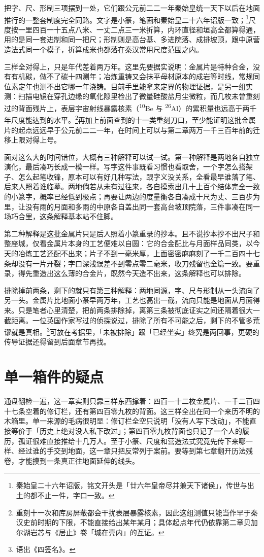 把字、尺、形制三项摆到一处，它们跟公元前二二一年秦始皇统一天下以后在地面推行的一整套制度完全同路。文字是小篆，笔画和秦始皇二十六年诏版一致；\footnote{秦始皇二十六年诏版，铭文开头是「廿六年皇帝尽并兼天下诸侯」，传世与出土的都不止一件，字口一致。}尺度按一里四百一十五点八米、一丈二点三一米折算，内环直径和垣高全都算得通，用的是同一套进制和同一把尺；形制则是高台基、多进院落、成排坡顶，跟中原营造法式同一个模子，折算成米也都落在秦汉常用尺度范围之内。

三样全对得上，只是年代差着两万年。这里先要据实说明：金属片是特种合金，没有有机碳，做不了碳十四测年；冶炼重铸又会抹平母材原本的成岩等时线，常规同位素定年也测不出它哪一年浇铸。目前手里能拿来定界的物理证据，是另一组实测：扫描电镜在穿孔边缘的氧化隙里检出了微量硅酸盐月尘微粒，而几枚未曾重刻过的背面残片上，表层宇宙射线暴露核素（\textsuperscript{10}Be 与 \textsuperscript{26}Al）的累积量也远高于两千年尺度能达到的水平。\footnote{重刻十一次和库房屏蔽都会干扰表层暴露核素，因此这组测值只能当作早于秦汉史前时期的下限，不能直接给出某年某月；具体起点年代仍依靠第二章贝加尔湖岩芯与《居止》卷「城在壳内」的互证。}再加上前面查到的十一类重刻刀口，至少能证明这批金属片的起点远远早于公元前二二一年，在时间上可以与第二章两万一千三百年前的迁移上限对得上号。

面对这么大的时间错位，大概有三种解释可以试一试。第一种解释是两地各自独立演化，最后凑巧长成一模一样。写字这件事既看习惯也看取舍，一个字怎么搭架子、怎么起笔收锋，原本可以有好几种写法，跟字义没关系，全看最早谁落了笔、后来人照着谁临摹。两地倘若从未有过往来，各自摸索出几十上百个结体完全一致的小篆字，概率已经低到极点；再要让两边的度量衡各自凑成十尺为丈、三百步为里，让没有雨的月面和多雨的中原各自盖出同一套高台坡顶院落，三件事凑在同一场巧合里，这条解释基本站不住脚。

第二种解释是这批金属片只是后人照着小篆重录的抄本。且不说抄本抄不出尺子和整座城，仅看金属片本身的工艺便难以自圆：它的合金配比与月面样品同类，以今天的冶炼工艺还配不出来；片子不到一毫米厚，上面密密麻麻刻了一千二百四十七条却没有一片开裂；字口深浅误差不到零点零二毫米，收刀残留也全篇一致。要重录，得先重造出这么薄的合金片，既然今天造不出来，这条解释也可以排除。

排除掉前两条，剩下的就只有第三种解释：两地同源，字、尺与形制从一头流向了另一头。金属片比地面小篆早两万年，工艺也高出一截，流向只能是地面从月面得来。只是笔者心里清楚，把前两条排除掉，离第三条被彻底证实之间还隔着很大一截距离。一位英国作家写过的侦探说过，排除了所有不可能之后，剩下的不管多荒谬就是真相。\footnote{语出《四签名》。}可放在考据里，「未被排除」跟「已经坐实」终究是两回事，更硬的传导证据还得留到后面章节再找。

\section{单一箱件的疑点}

通盘翻检一遍，这一章实则只靠三样东西撑着：四百一十二枚金属片、一千二百四十七条空着的修订栏，还有第四百零九枚的背面。这三样全出在同一个来历不明的木箱里。单一来源的毛病很明显：修订栏全空只说明「没有人写下改动」，不能直接等价于「历史上绝对没人私下改过」；第四百零九枚背面也只记了一个人的履历，孤证很难直接推给十几万人。至于小篆、尺度和营造法式究竟先传下来哪一样、经过谁的手交到地面，这一章只把反常列于案前。要等到第七章翻开历法残卷，才能摸到一条真正往地面延伸的线头。

